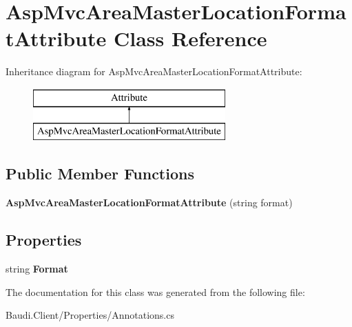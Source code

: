 \hypertarget{class_asp_mvc_area_master_location_format_attribute}{}\section{Asp\+Mvc\+Area\+Master\+Location\+Format\+Attribute Class Reference}
\label{class_asp_mvc_area_master_location_format_attribute}
Inheritance diagram for Asp\+Mvc\+Area\+Master\+Location\+Format\+Attribute\+:\begin{figure}[H]
\begin{center}
\leavevmode
\includegraphics[height=2.000000cm]{class_asp_mvc_area_master_location_format_attribute}
\end{center}
\end{figure}
\subsection*{Public Member Functions}
\begin{DoxyCompactItemize}
\item 
\hypertarget{class_asp_mvc_area_master_location_format_attribute_ab46b99bdef3d52b97af74a67590c2aab}{}{\bfseries Asp\+Mvc\+Area\+Master\+Location\+Format\+Attribute} (string format)\label{class_asp_mvc_area_master_location_format_attribute_ab46b99bdef3d52b97af74a67590c2aab}

\end{DoxyCompactItemize}
\subsection*{Properties}
\begin{DoxyCompactItemize}
\item 
\hypertarget{class_asp_mvc_area_master_location_format_attribute_a4cb37b1a8f40ba0e5285cd1e602cf1c3}{}string {\bfseries Format}\label{class_asp_mvc_area_master_location_format_attribute_a4cb37b1a8f40ba0e5285cd1e602cf1c3}

\end{DoxyCompactItemize}


The documentation for this class was generated from the following file\+:\begin{DoxyCompactItemize}
\item 
Baudi.\+Client/\+Properties/Annotations.\+cs\end{DoxyCompactItemize}
